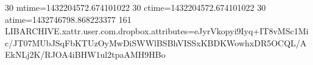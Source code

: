30 mtime=1432204572.674101022
30 ctime=1432204572.674101022
30 atime=1432746798.868223377
161 LIBARCHIVE.xattr.user.com.dropbox.attributes=eJyrVkopyi9Iyq+IT8vMSc1Mic/JT07MUbJSqFbKTUzOyMwDiSWWlBSBhVISSxKBDKWowhxDR5OCQL/AEkNLj2K/RJOA4iBHW1ul2tpaAMH9HBo
